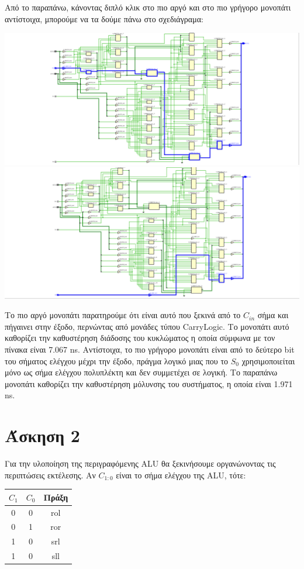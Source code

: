 \documentclass[11pt, a4paper]{report}
\begin{document}
Από το παραπάνω, κάνοντας διπλό κλικ στο πιο αργό και στο πιο γρήγορο μονοπάτι αντίστοιχα, μπορούμε να τα δούμε πάνω στο σχεδιάγραμα:
\begin{center}
	\includegraphics[width=\textwidth]{./images/alu-1/Slowest_Path.png}
	\includegraphics[width=\textwidth]{./images/alu-1/Fastest_Path.png}
\end{center}

Το πιο αργό μονοπάτι παρατηρούμε ότι είναι αυτό που ξεκινά από το $C_{in}$ σήμα και πήγαινει στην έξοδο, περνώντας από μονάδες τύπου CarryLogic.
Το μονοπάτι αυτό καθορίζει την καθυστέρηση διάδοσης του κυκλώματος η οποία σύμφωνα με τον πίνακα είναι 7.067 ns.
Αντίστοιχα, το πιο γρήγορο μονοπάτι είναι από το δεύτερο bit του σήματος ελέγχου μέχρι την έξοδο, πράγμα λογικό μιας που το $S_0$ χρησιμοποιείται μόνο ως σήμα ελέγχου πολυπλέκτη και δεν συμμετέχει σε λογική.
Το παραπάνω μονοπάτι καθορίζει την καθυστέρηση μόλυνσης του συστήματος, η οποία είναι 1.971 ns.

\section{Άσκηση 2}
Για την υλοποίηση της περιγραφόμενης ALU θα ξεκινήσουμε οργανώνοντας τις περιπτώσεις εκτέλεσης.
Αν $C_{1:0}$ είναι το σήμα ελέγχου της ALU, τότε:
\begin{center}
  \begin{tabular}{|c|c|c|}
    \hline
    $C_1$ & $C_0$ & Πράξη \\
    \hline
    0 & 0 & rol \\
    0 & 1 & ror \\
    1 & 0 & srl \\
    1 & 0 & sll \\
    \hline
  \end{tabular}
\end{center}
\end{document}
